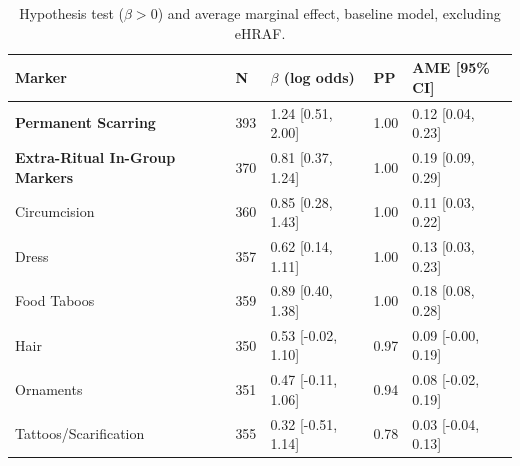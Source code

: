 \begin{table}[!ht]
\centering
\small
\caption{Hypothesis test ($\beta > 0$) and average marginal effect, baseline model, excluding eHRAF.}
\label{tab:extnoehraf_hypothesis_ame_baseline}
\begin{tabular}{lllll}
\toprule
Marker & N & $\beta$ (log odds) & PP & AME [95\% CI] \\
\midrule
\textbf{Permanent Scarring} & 393 & 1.24 [0.51, 2.00] & 1.00 & 0.12 [0.04, 0.23] \\
\textbf{Extra-Ritual In-Group Markers} & 370 & 0.81 [0.37, 1.24] & 1.00 & 0.19 [0.09, 0.29] \\
\midrule
Circumcision & 360 & 0.85 [0.28, 1.43] & 1.00 & 0.11 [0.03, 0.22] \\
Dress & 357 & 0.62 [0.14, 1.11] & 1.00 & 0.13 [0.03, 0.23] \\
Food Taboos & 359 & 0.89 [0.40, 1.38] & 1.00 & 0.18 [0.08, 0.28] \\
Hair & 350 & 0.53 [-0.02, 1.10] & 0.97 & 0.09 [-0.00, 0.19] \\
Ornaments & 351 & 0.47 [-0.11, 1.06] & 0.94 & 0.08 [-0.02, 0.19] \\
Tattoos/Scarification & 355 & 0.32 [-0.51, 1.14] & 0.78 & 0.03 [-0.04, 0.13] \\
\bottomrule
\end{tabular}
\end{table}